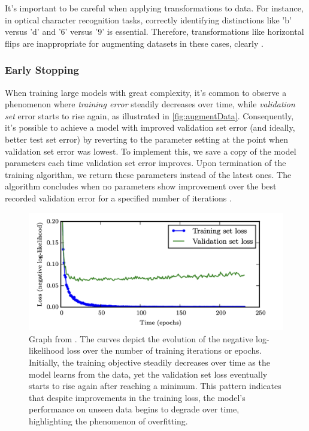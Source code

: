 \documentclass{article}
\begin{document}
It's important to be careful when applying transformations to data. For instance, in optical character recognition tasks, correctly identifying distinctions like 'b' versus 'd' and '6' versus '9' is essential. Therefore, transformations like horizontal flips are inappropriate for augmenting datasets in these cases, clearly \citep{Goodfellow-et-al-2016}. 
\subsubsection{Early Stopping}%
  \label{sub:Early Stopping}
When training large models with great complexity, it's common to observe a phenomenon where \textit{training error} steadily decreases over time, while \textit{validation set} error starts to rise again, as illustrated in \autoref{fig:augmentData}. Consequently, it's possible to achieve a model with improved validation set error (and ideally, better test set error) by reverting to the parameter setting at the point when validation set error was lowest. To implement this, we save a copy of the model parameters each time validation set error improves. Upon termination of the training algorithm, we return these parameters instead of the latest ones. The algorithm concludes when no parameters show improvement over the best recorded validation error for a specified number of iterations \citep{Goodfellow-et-al-2016}. 
\begin{figure}
\includegraphics{augmentData}
  \caption{Graph from \cite{Goodfellow-et-al-2016}. The curves depict the evolution of the negative log-likelihood loss over the number of training iterations or epochs. Initially, the training objective steadily decreases over time as the model learns from the data, yet the validation set loss eventually starts to rise again after reaching a minimum. This pattern indicates that despite improvements in the training loss, the model's performance on unseen data begins to degrade over time, highlighting the phenomenon of overfitting.}
  \label{fig:augmentData}
\end{figure}
\end{document}
